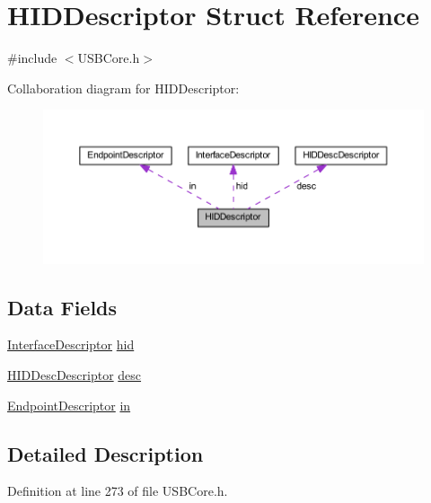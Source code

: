 \hypertarget{struct_h_i_d_descriptor}{}\section{H\+I\+D\+Descriptor Struct Reference}
\label{struct_h_i_d_descriptor}


{\ttfamily \#include $<$U\+S\+B\+Core.\+h$>$}



Collaboration diagram for H\+I\+D\+Descriptor\+:\nopagebreak
\begin{figure}[H]
\begin{center}
\leavevmode
\includegraphics[width=350pt]{struct_h_i_d_descriptor__coll__graph}
\end{center}
\end{figure}
\subsection*{Data Fields}
\begin{DoxyCompactItemize}
\item 
\hyperlink{struct_interface_descriptor}{Interface\+Descriptor} \hyperlink{struct_h_i_d_descriptor_a81907e74fcb6fd20130a4a921e4be5fd}{hid}
\item 
\hyperlink{struct_h_i_d_desc_descriptor}{H\+I\+D\+Desc\+Descriptor} \hyperlink{struct_h_i_d_descriptor_ae46b89dcb6c43addf455fc25ebbf9963}{desc}
\item 
\hyperlink{struct_endpoint_descriptor}{Endpoint\+Descriptor} \hyperlink{struct_h_i_d_descriptor_a93dcef3b3e3062b904269bcad94771b5}{in}
\end{DoxyCompactItemize}


\subsection{Detailed Description}


Definition at line 273 of file U\+S\+B\+Core.\+h.



